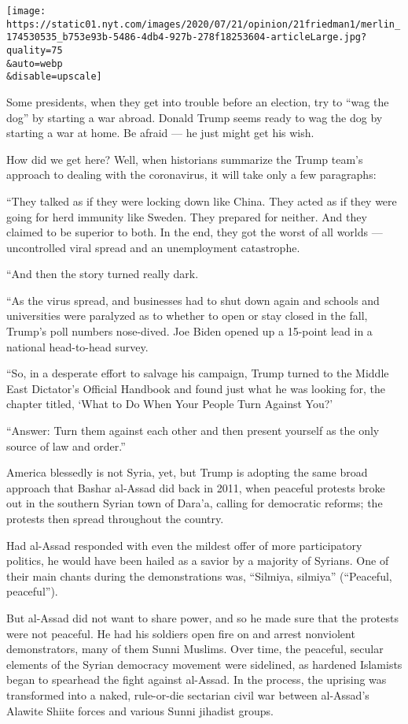\texttt{[image: https://static01.nyt.com/images/2020/07/21/opinion/21friedman1/merlin\_174530535\_b753e93b-5486-4db4-927b-278f18253604-articleLarge.jpg?quality=75\\\&auto=webp\\\&disable=upscale]}

Some presidents, when they get into trouble before an election, try to
``wag the dog'' by starting a war abroad. Donald Trump seems ready to
wag the dog by starting a war at home. Be afraid --- he just might get
his wish.

How did we get here? Well, when historians summarize the Trump team's
approach to dealing with the coronavirus, it will take only a few
paragraphs:

``They talked as if they were locking down like China. They acted as if
they were going for herd immunity like Sweden. They prepared for
neither. And they claimed to be superior to both. In the end, they got
the worst of all worlds --- uncontrolled viral spread and an
unemployment catastrophe.

``And then the story turned really dark.

``As the virus spread, and businesses had to shut down again and schools
and universities were paralyzed as to whether to open or stay closed in
the fall, Trump's poll numbers nose-dived. Joe Biden opened up a
15-point lead in a national head-to-head survey.

``So, in a desperate effort to salvage his campaign, Trump turned to the
Middle East Dictator's Official Handbook and found just what he was
looking for, the chapter titled, `What to Do When Your People Turn
Against You?'

``Answer: Turn them against each other and then present yourself as the
only source of law and order.''

America blessedly is not Syria, yet, but Trump is adopting the same
broad approach that Bashar al-Assad did back in 2011, when peaceful
protests broke out in the southern Syrian town of Dara'a, calling for
democratic reforms; the protests then spread throughout the country.

Had al-Assad responded with even the mildest offer of more participatory
politics, he would have been hailed as a savior by a majority of
Syrians. One of their main chants during the demonstrations was,
``Silmiya, silmiya'' (``Peaceful, peaceful'').

But al-Assad did not want to share power, and so he made sure that the
protests were not peaceful. He had his soldiers open fire on and arrest
nonviolent demonstrators, many of them Sunni Muslims. Over time, the
peaceful, secular elements of the Syrian democracy movement were
sidelined, as hardened Islamists began to spearhead the fight against
al-Assad. In the process, the uprising was transformed into a naked,
rule-or-die sectarian civil war between al-Assad's Alawite Shiite forces
and various Sunni jihadist groups.

